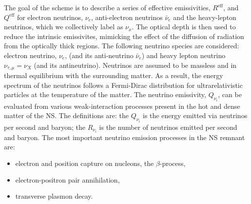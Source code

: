 %
The goal of the scheme is to describe a series of effective emissivities, $R^{\text{eff}}$, and $Q^{\text{eff}}$ 
for electron neutrinos, $\nu_e$, anti-electron neutrinos $\bar{\nu}_e$ and the heavy-lepton neutrinos, 
which we collectively label as $\nu_x$.
The optical depth is then used to reduce the intrinsic emissivites, mimicking the effect of the 
diffusion of radiation from the optically thick regions.
%
%
%
The following neutrino species are considered: electron neutrino, $\nu_e$, 
(and its anti-neutrino $\bar{\nu}_e$) and heavy lepton neutrino $\nu_{\tau,\mu}=\nu_X$ (and its antineutrino). %
%
Neutrinos are assumed to be massless and in thermal equilibrium with the surrounding matter.
As a result, the energy spectrum of the neutrinos follows a Fermi-Dirac distribution for
ultrarelativistic particles at the temperature of the matter. 
%
%
The neutrino emissivity, $Q_{\nu_{i}}$, can be evaluated from various weak-interaction processes 
present in the hot and dense matter of the NS. 
The definitions are: the $Q_{\nu_{i}}$ is the energy emitted via neutrinos per second and baryon;
the $R_{\nu_{i}}$ is the number of neutrinos emitted per second and baryon.
%
The most important neutrino emission processes in the NS remnant are: 
\begin{itemize}
    \item electron and position capture on nucleons, the $\beta$-process,
    \item electron-positron pair annihilation, 
    \item transverse plasmon decay.
\end{itemize}
